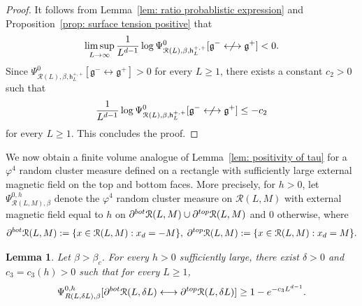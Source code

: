 \documentclass[11pt,a4paper]{article}
\newtheorem{lemma}[theorem]{Lemma}
\theoremstyle{definition}
\numberwithin{equation}{section}
\newcommand\fg{\mathfrak{g}}
\begin{document}
\begin{proof}
It follows from Lemma~\ref{lem: ratio probablistic expression} and Proposition~\ref{prop: surface tension positive} that 
\begin{equation}
\limsup_{L\to\infty}\frac{1}{L^{d-1}}\log\Psi^{0}_{\mathcal R(L),\beta,\mathsf{h}^{+,+}_{L}}[\fg^{-} \centernot\longleftrightarrow \fg^{+}]<0.    
\end{equation}
Since $\Psi^{0}_{\mathcal R(L),\beta,\mathsf{h}^{+,+}_{L}}[\fg^{-} \longleftrightarrow \fg^{+}]>0$ for every $L\geq 1$, there exists a constant $c_2>0$ such that 
\begin{equation}
\frac{1}{L^{d-1}}\log\Psi^{0}_{\mathcal R(L),\beta,\mathsf{h}^{+,+}_{L}}[\fg^{-} \centernot\longleftrightarrow \fg^{+}]\leq -c_2  \end{equation}
for every $L\geq 1$. This concludes the proof.
\end{proof}


We now obtain a finite volume analogue of Lemma~\ref{lem: positivity of tau} for a $\varphi^4$ random cluster measure defined on a rectangle with sufficiently large external magnetic field on the top and bottom faces. More precisely, for $h>0$, let $\Psi^{0,h}_{\mathcal{R}(L,M),\beta}$ denote the $\varphi^4$ random cluster measure on $\mathcal{R}(L,M)$ with external magnetic field equal to $h$ on $\partial^{\rm bot} \mathcal{R}(L,M)\cup \partial^{\rm top} \mathcal{R}(L,M)$ and $0$ otherwise, where
\begin{equation}
    \partial^{\rm bot} \mathcal{R}(L,M):=\{x \in \mathcal{R}(L,M): x_d=-M\}, \; \partial^{\rm top} \mathcal{R}(L,M):=\{x \in \mathcal{R}(L,M): x_d=M\}.
\end{equation}

\begin{lemma}\label{lem: strip to rectangle}
Let $\beta>\beta_c$. For every $h>0$ sufficiently large, there exist $\delta>0$ and $c_3=c_3(h)>0$ such that for every $L \geq 1$,
\begin{equation}
\Psi^{0,h}_{R(L,\delta L),\beta}[\partial^{{\rm bot}} \mathcal R(L, \delta L) \longleftrightarrow\partial^{{\rm top}} \mathcal R(L, \delta L)] \geq 1 - e^{-c_3 L^{d-1}}. 
\end{equation}
\end{lemma}
\end{document}
